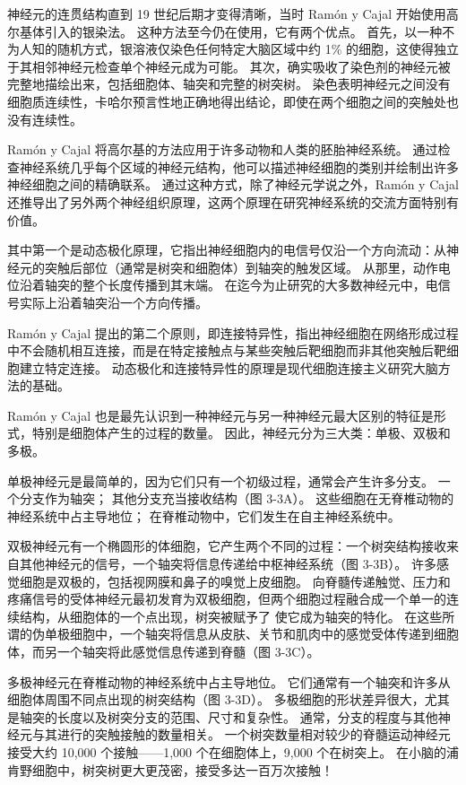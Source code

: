 神经元的连贯结构直到 19 世纪后期才变得清晰，当时 Ramón y Cajal 开始使用高尔基体引入的银染法。 这种方法至今仍在使用，它有两个优点。 首先，以一种不为人知的随机方式，银溶液仅染色任何特定大脑区域中约 1\% 的细胞，这使得独立于其相邻神经元检查单个神经元成为可能。 其次，确实吸收了染色剂的神经元被完整地描绘出来，包括细胞体、轴突和完整的树突树。 染色表明神经元之间没有细胞质连续性，卡哈尔预言性地正确地得出结论，即使在两个细胞之间的突触处也没有连续性。

Ramón y Cajal 将高尔基的方法应用于许多动物和人类的胚胎神经系统。 通过检查神经系统几乎每个区域的神经元结构，他可以描述神经细胞的类别并绘制出许多神经细胞之间的精确联系。 通过这种方式，除了神经元学说之外，Ramón y Cajal 还推导出了另外两个神经组织原理，这两个原理在研究神经系统的交流方面特别有价值。

其中第一个是动态极化原理，它指出神经细胞内的电信号仅沿一个方向流动：从神经元的突触后部位（通常是树突和细胞体）到轴突的触发区域。 从那里，动作电位沿着轴突的整个长度传播到其末端。 在迄今为止研究的大多数神经元中，电信号实际上沿着轴突沿一个方向传播。

Ramón y Cajal 提出的第二个原则，即连接特异性，指出神经细胞在网络形成过程中不会随机相互连接，而是在特定接触点与某些突触后靶细胞而非其他突触后靶细胞建立特定连接。 动态极化和连接特异性的原理是现代细胞连接主义研究大脑方法的基础。

Ramón y Cajal 也是最先认识到一种神经元与另一种神经元最大区别的特征是形式，特别是细胞体产生的过程的数量。 因此，神经元分为三大类：单极、双极和多极。

单极神经元是最简单的，因为它们只有一个初级过程，通常会产生许多分支。 一个分支作为轴突； 其他分支充当接收结构（图 3-3A）。 这些细胞在无脊椎动物的神经系统中占主导地位； 在脊椎动物中，它们发生在自主神经系统中。

双极神经元有一个椭圆形的体细胞，它产生两个不同的过程：一个树突结构接收来自其他神经元的信号，一个轴突将信息传递给中枢神经系统（图 3-3B）。 许多感觉细胞是双极的，包括视网膜和鼻子的嗅觉上皮细胞。 向脊髓传递触觉、压力和疼痛信号的受体神经元最初发育为双极细胞，但两个细胞过程融合成一个单一的连续结构，从细胞体的一个点出现，树突被赋予了 使它成为轴突的特化。 在这些所谓的伪单极细胞中，一个轴突将信息从皮肤、关节和肌肉中的感觉受体传递到细胞体，而另一个轴突将此感觉信息传递到脊髓（图 3-3C）。

多极神经元在脊椎动物的神经系统中占主导地位。 它们通常有一个轴突和许多从细胞体周围不同点出现的树突结构（图 3-3D）。 多极细胞的形状差异很大，尤其是轴突的长度以及树突分支的范围、尺寸和复杂性。 通常，分支的程度与其他神经元与其进行的突触接触的数量相关。 一个树突数量相对较少的脊髓运动神经元接受大约 10,000 个接触——1,000 个在细胞体上，9,000 个在树突上。 在小脑的浦肯野细胞中，树突树更大更茂密，接受多达一百万次接触！

